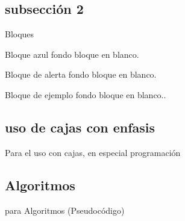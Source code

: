 \documentclass{libs/ufc_format}
\begin{document}
\subsection{subsección 2}
\begin{frame}{Bloques}
    \begin{block}{Bloque azul}
        fondo bloque en blanco.
    \end{block}

    \begin{alertblock}{Bloque de alerta}
        fondo bloque en blanco.
    \end{alertblock}

    \begin{exampleblock}{Bloque de ejemplo}
        fondo bloque en blanco..
    \end{exampleblock}   
\end{frame}

\subsection{uso de cajas con enfasis}
\begin{frame}{Para el uso con cajas, en especial programación}

    \pause


    \pause

\end{frame}

\subsection{Algoritmos}
\begin{frame}{para Algoritmos (Pseudocódigo)}
    \begin{algorithm}[H]
        \SetAlgoLined
        \LinesNumbered
         \caption{Algorithm Example}
    \end{algorithm}
\end{frame}
\end{document}
